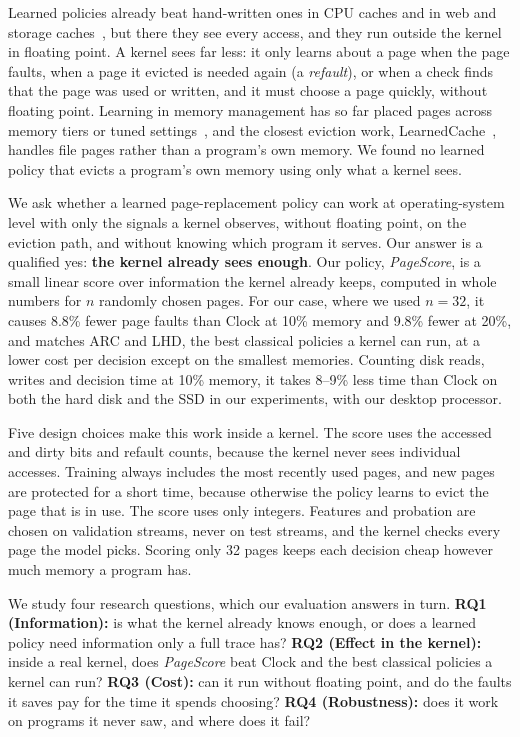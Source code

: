 \documentclass{article}
\newcommand{\clock}{Clock\xspace}
\DeclareRobustCommand{\pagescore}{\textit{PageScore}}
\begin{document}
Learned policies already beat hand-written ones in CPU caches and in web and storage caches~\citep{jain2016hawkeye,vietri2018lecar,shi2019glider,song2020lrb,rodriguez2021cacheus,shah2022mockingjay,song2023halp}, but there they see every access, and they run outside the kernel in floating point. A kernel sees far less: it only learns about a page when the page faults, when a page it evicted is needed again (a \emph{refault}), or when a check finds that the page was used or written, and it must choose a page quickly, without floating point. Learning in memory management has so far placed pages across memory tiers or tuned settings~\citep{doudali2019kleio,lagarcavilla2019farmemory,ramaswamy2026xtier}, and the closest eviction work, LearnedCache~\citep{qi2026learnedcache}, handles file pages rather than a program's own memory. We found no learned policy that evicts a program's own memory using only what a kernel sees.

We ask whether a learned page-replacement policy can work at operating-system level with only the signals a kernel observes, without floating point, on the eviction path, and without knowing which program it serves. Our answer is a qualified yes: \textbf{the kernel already sees enough}. Our policy, \pagescore{}, is a small linear score over information the kernel already keeps, computed in whole numbers for $n$ randomly chosen pages. For our case, where we used $n = 32$, it causes 8.8\% fewer page faults than \clock at 10\% memory and 9.8\% fewer at 20\%, and matches ARC and LHD, the best classical policies a kernel can run, at a lower cost per decision except on the smallest memories. Counting disk reads, writes and decision time at 10\% memory, it takes 8--9\% less time than \clock on both the hard disk and the SSD in our experiments, with our desktop processor. 

Five design choices make this work inside a kernel. The score uses the accessed and dirty bits and refault counts, because the kernel never sees individual accesses. Training always includes the most recently used pages, and new pages are protected for a short time, because otherwise the policy learns to evict the page that is in use. The score uses only integers. Features and probation are chosen on validation streams, never on test streams, and the kernel checks every page the model picks. Scoring only 32 pages keeps each decision cheap however much memory a program has. 

We study four research questions, which our evaluation answers in turn. \textbf{RQ1 (Information):} is what the kernel already knows enough, or does a learned policy need information only a full trace has? \textbf{RQ2 (Effect in the kernel):} inside a real kernel, does \pagescore{} beat \clock and the best classical policies a kernel can run? \textbf{RQ3 (Cost):} can it run without floating point, and do the faults it saves pay for the time it spends choosing? \textbf{RQ4 (Robustness):} does it work on programs it never saw, and where does it fail?
\end{document}
